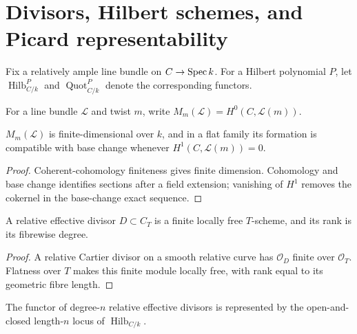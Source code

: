 \chapter{Divisors, Hilbert schemes, and Picard representability}
\label{mk-ch-representability}

Fix a relatively ample line bundle on \(C\to\operatorname{Spec} k\).  For a Hilbert
polynomial \(P\), let \(\operatorname{Hilb}^P_{C/k}\) and
\(\operatorname{Quot}^P_{C/k}\) denote the corresponding functors.

\begin{definition}
  \label{mk-def-section-module}
  \cite{kleiman-picard}
  For a line bundle \(\mathcal L\) and twist \(m\), write
  \(M_m(\mathcal L)=H^0(C,\mathcal L(m))\).
\end{definition}

\begin{lemma}
  \label{mk-lem-section-module-finite}
  \cite{hartshorne-ag,kleiman-picard}
  \(M_m(\mathcal L)\) is finite-dimensional over \(k\), and in a flat family
  its formation is compatible with base change whenever
  \(H^1(C,\mathcal L(m))=0\).
\end{lemma}

\begin{proof}
  Coherent-cohomology finiteness gives finite dimension.  Cohomology and base
  change identifies sections after a field extension; vanishing of \(H^1\)
  removes the cokernel in the base-change exact sequence.
\end{proof}

\begin{lemma}
  \label{mk-lem-effective-divisor-flat-length}
  \cite{kleiman-picard}
  A relative effective divisor \(D\subset C_T\) is a finite locally free
  \(T\)-scheme, and its rank is its fibrewise degree.
\end{lemma}

\begin{proof}
  A relative Cartier divisor on a smooth relative curve has
  \(\mathcal O_D\) finite over \(\mathcal O_T\).  Flatness over \(T\) makes
  this finite module locally free, with rank equal to its geometric fibre
  length.
\end{proof}

\begin{proposition}
  \label{mk-prop-divisor-hilbert-open}
  \cite{kleiman-picard,nitsure-hilbert-quot}
  The functor of degree-\(n\) relative effective divisors is represented by
  the open-and-closed length-\(n\) locus of \(\operatorname{Hilb}_{C/k}\).
\end{proposition}

